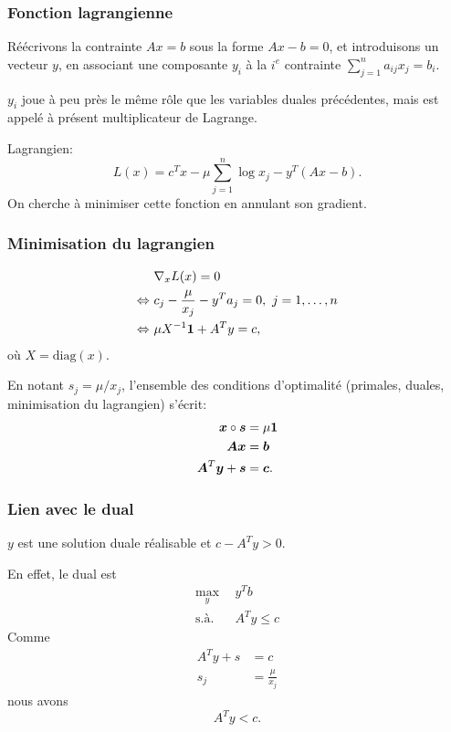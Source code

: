 \documentclass[usepdftitle=false, aspectratio=169]{beamer}
\begin{document}
\begin{frame}
\frametitle{Fonction lagrangienne}

Réécrivons la contrainte $Ax = b$ sous la forme $Ax - b = 0$, et introduisons un vecteur $y$, en associant une composante $y_i$ à la $i^e$ contrainte $\sum_{j = 1}^n a_{ij} x_j = b_i$.

\mbox{}

$y_i$ joue à peu près le même rôle que les variables duales précédentes, mais est appelé à présent multiplicateur de Lagrange.

\mbox

Lagrangien:
\[
L(x) = c^Tx - \mu \sum_{j = 1}^n \log x_j - y^T(Ax - b).
\]
On cherche à minimiser cette fonction en annulant son gradient.

\end{frame}

\begin{frame}
\frametitle{Minimisation du lagrangien}

\begin{align*}
& \nabla_x L(x) = 0 \\
\Leftrightarrow\ &
c_j - \frac{\mu}{x_j} - y^Ta_j = 0,\ j = 1,\ldots,n\\
\Leftrightarrow\ &
\mu X^{-1}{\boldsymbol{1}} + A^Ty = c,
\end{align*}
où $X = \text{diag}(x)$.

\mbox{}

En notant $s_j = \mu/x_j$, l'ensemble des conditions d'optimalité (primales, duales, minimisation du lagrangien) s'écrit:
\begin{align*}
{\boldsymbol{x}} \circ {\boldsymbol{s}} &= \mu {\boldsymbol{1}} \\
{\boldsymbol{A}}{\boldsymbol{x}} &= {\boldsymbol{b}} \\
{\boldsymbol{A}}^T{\boldsymbol{y}} + {\boldsymbol{s}} & = {\boldsymbol{c}}.
\end{align*}

\end{frame}

\begin{frame}
\frametitle{Lien avec le dual}

$y$ est une solution duale réalisable et $c - A^T y > 0$.

\mbox{}

En effet, le dual est
\begin{align*}
\max_y\ \ & y^T b \\
\mbox{s.à. } & A^T y \leq c
\end{align*}
Comme
\begin{align*}
A^Ty + s &= c\\
s_j &= \frac{\mu}{x_j}
\end{align*}
nous avons
\[
A^T y < c.
\]

\end{frame}
\end{document}
